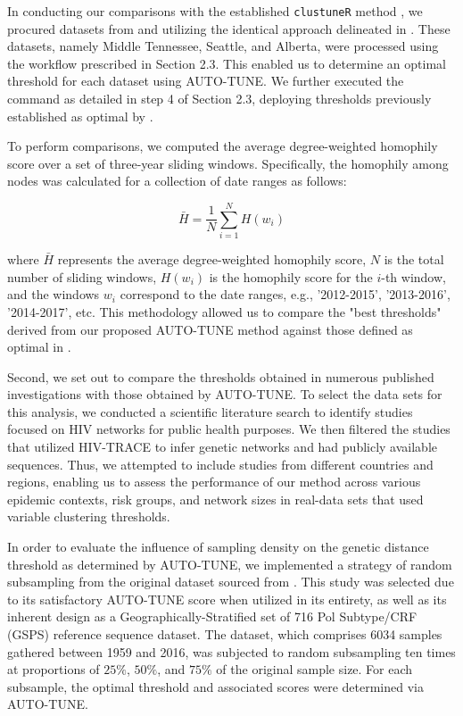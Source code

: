 \documentclass[utf8]{FrontiersinHarvard} %
\newcommand{\TODO}[1]{{\color{red}{#1}}}
\begin{document}
In conducting our comparisons with the established {\tt clustuneR} method \TODO{citation}, we
procured datasets from \cite{wolf_short_2017} and
\cite{vrancken_multi-faceted_2017} utilizing the identical approach delineated
in \cite{chato_public_2020}. These datasets, namely Middle Tennessee,
Seattle, and Alberta, were processed using the workflow prescribed
in Section 2.3. This enabled us to determine an optimal threshold for each
dataset using AUTO-TUNE. We further executed the command
as detailed in step 4 of Section 2.3, deploying thresholds previously
established as optimal by \cite{chato_public_2020}.

To perform comparisons, we computed the average degree-weighted homophily score
over a set of three-year sliding windows. Specifically, the homophily among
nodes was calculated for a collection of date ranges as follows:

\begin{equation} \bar{H} = \frac{1}{N}\sum_{i=1}^{N} H(w_i) \end{equation}

where $\bar{H}$ represents the average degree-weighted homophily score, $N$
is the total number of sliding windows, $H(w_i)$ is the homophily score for
the $i$-th window, and the windows $w_i$ correspond to the date ranges, e.g.,
'2012-2015', '2013-2016', '2014-2017', etc. This methodology allowed us to
compare the "best thresholds" derived from our proposed AUTO-TUNE method
against those defined as optimal in \cite{chato_public_2020}. 

Second, we set out to compare the thresholds obtained in numerous published
investigations with those obtained by AUTO-TUNE. To select the data sets for
this analysis, we conducted a scientific literature search to identify studies
focused on HIV networks for public health purposes. We then filtered the
studies that utilized HIV-TRACE to infer genetic networks and had publicly
available sequences. Thus, we attempted to include studies from different
countries and regions, enabling us to assess the performance of our method
across various epidemic contexts, risk groups, and network sizes in real-data
sets that used variable clustering thresholds. 

In order to evaluate the influence of sampling density on the genetic distance
threshold as determined by AUTO-TUNE, we implemented a strategy of random
subsampling from the original dataset sourced from \cite{rhee_national_2019}.
This study was selected due to its satisfactory AUTO-TUNE score when utilized
in its entirety, as well as its inherent design as a Geographically-Stratified
set of 716 Pol Subtype/CRF (GSPS) reference sequence dataset. The dataset,
which comprises 6034 samples gathered between 1959 and 2016, was subjected to
random subsampling ten times at proportions of $25\%$, $50\%$, and $75\%$ of
the original sample size. For each subsample, the optimal threshold and
associated scores were determined via AUTO-TUNE.
\end{document}
